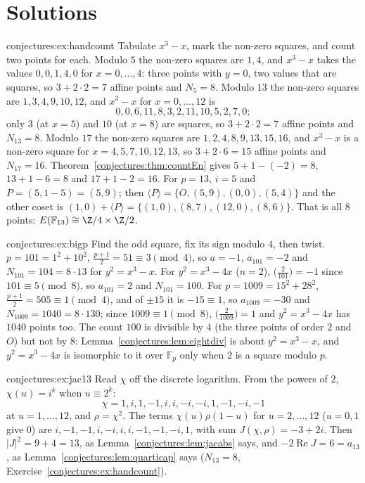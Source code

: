 \section{Solutions}

\begin{solution}{conjectures:ex:handcount}
\idea Tabulate $x^3-x$, mark the non-zero squares, and count two points for each.
\writeup Modulo $5$ the non-zero squares are $1,4$, and $x^3-x$ takes the values $0,0,1,4,0$ for $x=0,\dots,4$: three points with $y=0$, two values that are
squares, so $3+2\cdot2=7$ affine points and $N_5=8$. Modulo $13$ the non-zero squares are $1,3,4,9,10,12$, and $x^3-x$ for $x=0,\dots,12$ is
\[
0,0,6,11,8,3,2,11,10,5,2,7,0;
\]
only $3$ (at $x=5$) and $10$ (at $x=8$) are squares, so $3+2\cdot2=7$ affine points and $N_{13}=8$. Modulo $17$ the non-zero squares are
$1,2,4,8,9,13,15,16$, and $x^3-x$ is a non-zero square for $x=4,5,7,10,12,13$, so $3+2\cdot6=15$ affine points and $N_{17}=16$. Theorem~\ref{conjectures:thm:countEn}
gives $5+1-(-2)=8$, $13+1-6=8$ and $17+1-2=16$. For $p=13$, $i=5$ and $P=(5,1-5)=(5,9)$; then $\langle P\rangle=\{O,(5,9),(0,0),(5,4)\}$ and the other coset
is $(1,0)+\langle P\rangle=\{(1,0),(8,7),(12,0),(8,6)\}$. That is all $8$ points: $E(\mathbb F_{13})\cong\Z/4\times\Z/2$.
\end{solution}

\begin{solution}{conjectures:ex:bigp}
\idea Find the odd square, fix its sign modulo $4$, then twist.
\writeup $p=101=1^2+10^2$, $\frac{p+1}2=51\equiv3\pmod4$, so $a=-1$, $a_{101}=-2$ and $N_{101}=104=8\cdot13$ for $y^2=x^3-x$. For $y^2=x^3-4x$ ($n=2$),
$\bigl(\frac2{101}\bigr)=-1$ since $101\equiv5\pmod8$, so $a_{101}=2$ and $N_{101}=100$. For $p=1009=15^2+28^2$, $\frac{p+1}2=505\equiv1\pmod4$, and of $\pm15$
it is $-15\equiv1$, so $a_{1009}=-30$ and $N_{1009}=1040=8\cdot130$; since $1009\equiv1\pmod8$, $\bigl(\frac2{1009}\bigr)=1$ and $y^2=x^3-4x$ has $1040$
points too. The count $100$ is divisible by $4$ (the three points of order $2$ and $O$) but not by $8$: Lemma~\ref{conjectures:lem:eightdiv} is about $y^2=x^3-x$, and
$y^2=x^3-4x$ is isomorphic to it over $\mathbb F_p$ only when $2$ is a square modulo $p$.
\end{solution}

\begin{solution}{conjectures:ex:jac13}
\idea Read $\chi$ off the discrete logarithm.
\writeup From the powers of $2$, $\chi(u)=i^k$ when $u\equiv2^k$:
\[
\chi=1,i,1,-1,i,i,-i,-i,1,-1,-i,-1
\]
at $u=1,\dots,12$, and $\rho=\chi^2$. The terms
$\chi(u)\rho(1-u)$ for $u=2,\dots,12$ ($u=0,1$ give $0$) are $i,-1,-1,i,-i,i,i,-1,-1,-i,1$, with sum $J(\chi,\rho)=-3+2i$. Then $|J|^2=9+4=13$, as
Lemma~\ref{conjectures:lem:jacabs} says, and $-2\operatorname{Re}J=6=a_{13}$, as Lemma~\ref{conjectures:lem:quarticap} says ($N_{13}=8$, Exercise~\ref{conjectures:ex:handcount}).
\end{solution}

